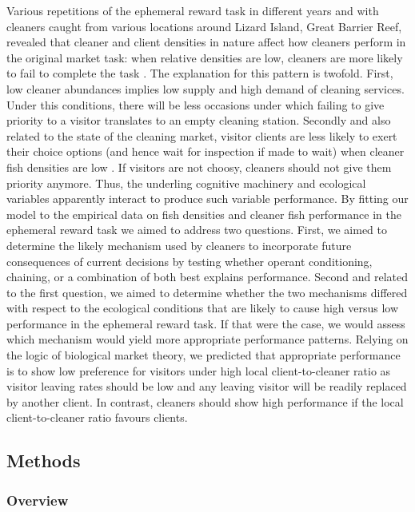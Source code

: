 \documentclass[]{rsos}%
\begin{document}
Various repetitions of the ephemeral reward task in different years and
with cleaners caught from various locations around Lizard Island,
Great Barrier Reef, revealed that cleaner and client densities in
nature affect how cleaners perform in the original market task:
when relative densities are low, cleaners are more likely to fail to
complete the task \citep{triki_Biological_2019, triki_Decrease_2018, wismer_Variation_2014}. The explanation for this pattern
is twofold. First, low cleaner abundances implies low supply and high demand
of cleaning services. Under this conditions, there will be less occasions under
which failing to give priority to a visitor translates to an empty
cleaning station. Secondly and also related to the state of the cleaning market,
visitor clients are less likely to exert their choice options
(and hence wait for inspection if made to wait) when
cleaner fish densities are low \citep{triki_Brain_2020}. If visitors are not choosy,
cleaners should not give them priority anymore. Thus, the underling
cognitive machinery and ecological variables apparently interact to produce
such variable performance. By fitting our model to the empirical data on
fish densities and cleaner fish performance in the ephemeral reward task
we aimed to address two questions. First, we aimed to determine the likely
mechanism used by cleaners to incorporate future consequences of current
decisions by testing whether operant conditioning, chaining, or a combination
of both best explains performance. Second and related to the first
question, we aimed to determine whether the two mechanisms differed
with respect to the ecological conditions that are likely to cause high
versus low performance in the ephemeral reward task. If that were the case,
we would assess which mechanism would yield more appropriate performance
patterns. Relying on the logic of biological market theory, we predicted
that appropriate performance is to show low preference for visitors under high
local client-to-cleaner ratio as visitor leaving rates should be low
and any leaving visitor will be readily replaced by another client. In contrast,
cleaners should show high performance if the local client-to-cleaner
ratio favours clients.

\hypertarget{methods}{%
\subsection{Methods}\label{methods}}

\hypertarget{overview}{%
\subsubsection{Overview}\label{overview}}
\end{document}
